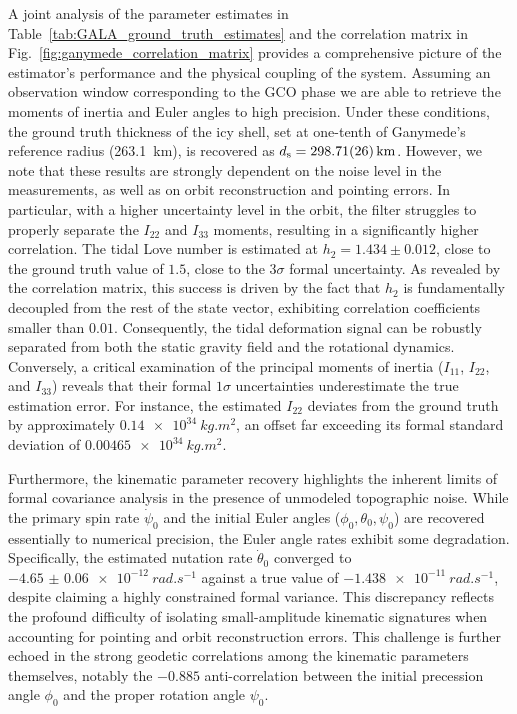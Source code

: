 \documentclass[lineno, pdflatex,sn-mathphys-ay]{sn-jnl}
\theoremstyle{thmstyleone}%
\theoremstyle{thmstyletwo}%
\theoremstyle{thmstylethree}%
\begin{document}
A joint analysis of the parameter estimates in Table~\ref{tab:GALA_ground_truth_estimates} and the correlation matrix in Fig.~\ref{fig:ganymede_correlation_matrix} provides a comprehensive picture of the estimator's performance and the physical coupling of the system. 
%
Assuming an observation window corresponding to the GCO phase we are able to retrieve the moments of inertia and Euler angles to high precision. Under these conditions, the ground truth thickness of the icy shell, set at one-tenth of Ganymede's reference radius (\SI{263.1}{km}), is recovered as 
${d_{\mathrm{s}} = \SI{298.71 \pm 0.26}{km}}$.
% 
However, we note that these results are strongly dependent on the noise level in the measurements, as well as on orbit reconstruction and pointing errors. In particular, with a higher uncertainty level in the orbit, the filter struggles to properly separate the $I_{22}$ and $I_{33}$ moments, resulting in a significantly higher correlation.
%
%
The tidal Love number is estimated at
${h_2 = \num{1.434} \pm \num{0.012}}$, close to the ground truth value of $\num{1.5}$, close to the $3\sigma$ formal uncertainty. As revealed by the correlation matrix, this success is driven by the fact that $h_2$ is fundamentally decoupled from the rest of the state vector, exhibiting correlation coefficients smaller than $0.01$. Consequently, the tidal deformation signal can be robustly separated from both the static gravity field and the rotational dynamics.
%
Conversely, a critical examination of the principal moments of inertia ($I_{11}$, $I_{22}$, and $I_{33}$) reveals that their formal $1\sigma$ uncertainties underestimate the true estimation error. For instance, the estimated $I_{22}$ deviates from the ground truth by approximately 
$\SI{0.14e34}{kg.m^2}$, an offset far exceeding its formal standard deviation of 
$\SI{0.00465e34}{kg.m^2}$. 
%

Furthermore, the kinematic parameter recovery highlights the inherent limits of formal covariance analysis in the presence of unmodeled topographic noise. While the primary spin rate $\dot{\psi}_0$ and the initial Euler angles ($\phi_0, \theta_0, \psi_0$) are recovered essentially to numerical precision, the Euler angle rates exhibit some degradation. Specifically, the estimated nutation rate $\dot{\theta}_0$ converged to 
$\SI{-4.65(6)e-12}{rad.s^{-1}}$
against a true value of 
$\SI{-1.438e-11}{rad.s^{-1}}$, despite claiming a highly constrained formal variance. This discrepancy reflects the profound difficulty of isolating small-amplitude kinematic signatures when accounting for pointing and orbit reconstruction errors. This challenge is further echoed in the strong geodetic correlations among the kinematic parameters themselves, notably the 
$-0.885$ anti-correlation between the initial precession angle $\phi_0$ and the proper rotation angle $\psi_0$. 
\end{document}
